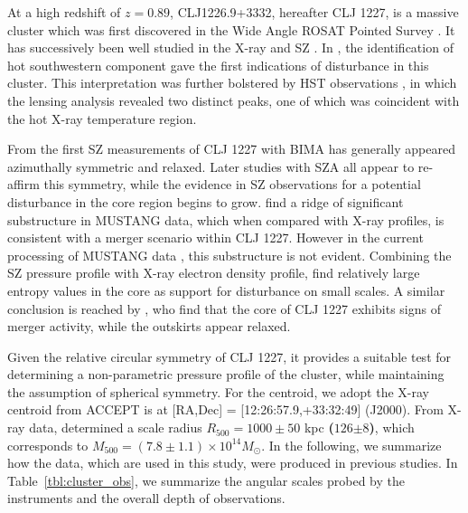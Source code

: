 \documentclass[twocolumn,traditabstract]{aa}
\begin{document}


At a high redshift of $z=0.89$, CLJ1226.9+3332, hereafter CLJ 1227, is a massive cluster which was first discovered in the
Wide Angle ROSAT Pointed Survey \citep[WARPS][]{ebeling2001}. It has successively been well studied in the X-ray
\citep[\emph{XMM},\emph{Chandra}, and \emph{XMM/Chandra}][respectively]{maughan2004,bonamente2006,maughan2007}
and SZ \citep[][]{joy2001,muchovej2007,mroczkowski2009,mroczkowski2011,bulbul2010,korngut2011,adam2015}.
In \citet{maughan2007}, the identification of hot southwestern component gave the first indications of disturbance
in this cluster. This interpretation was further bolstered by HST observations \citep{jee2009a}, in which the lensing
analysis revealed two distinct peaks, one of which was coincident with the hot X-ray temperature region.

From the first SZ measurements of CLJ 1227 with BIMA \citep[][]{joy2001} has generally appeared
azimuthally symmetric and relaxed. Later studies with SZA \citep{muchovej2007,mroczkowski2009,mroczkowski2011}
all appear to re-affirm this symmetry, while the evidence in SZ observations for a potential disturbance
in the core region begins to grow. \citet{korngut2011} find a ridge of significant substructure in
MUSTANG data, which when compared with X-ray profiles, is consistent with a merger scenario within
CLJ 1227. However in the current processing of MUSTANG data \citep{romero2017},
this substructure is not evident. Combining the SZ pressure profile with X-ray electron density profile,
\citet{adam2015} find relatively large entropy values in the core as support for disturbance on small scales.
A similar conclusion is reached by \citet{rumsey2016}, who find that the core
of CLJ 1227 exhibits signs of merger activity, while the outskirts appear relaxed.

Given the relative circular symmetry of CLJ 1227, it provides a suitable test for determining a non-parametric pressure
profile of the cluster, while maintaining the assumption of spherical symmetry. For the centroid, we adopt the X-ray
centroid from ACCEPT \citep{cavagnolo2009} is at [RA,Dec] = [12:26:57.9,+33:32:49] (J2000).
From X-ray data, \citet{mantz2010b} determined a scale radius $R_{500} = 1000 \pm 50$ kpc \textbf{($126$\asecs$\pm8$\asec)}, which corresponds to
$M_{500} = (7.8 \pm 1.1) \times 10^{14} M_{\odot}$. In the following, we summarize how the data, which are used in this study,
were produced in previous studies. In Table~\ref{tbl:cluster_obs}, we summarize the angular scales probed by the instruments
and the overall depth of observations.
\end{document}
